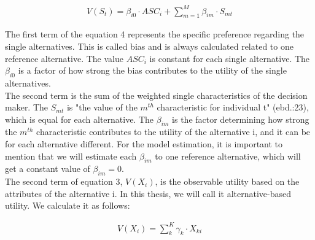\documentclass[12pt,dvipsnames]{article}%
\begin{document}
\begin{center}
\begin{align}
V(S_t) = \beta_{i0} \cdot ASC_i  +  \sum_{m=1}^M \beta_{im} \cdot S_{mt} \label{eq:test4}
\end{align}
\end{center}

The first term of the equation 4 represents the specific preference regarding the single alternatives. This is called bias and is always calculated related to one reference alternative. The value $ASC_i$ is constant for each single alternative. The $\beta_{i0}$ is a factor of how strong the bias contributes to the utility of the single alternatives. \\
The second term is the sum of the weighted single characteristics of the decision maker. The $S_{mt}$ is "the value of the $m^{th}$ characteristic for individual t" (ebd.:23), which is equal for each alternative.  The $\beta_{im}$ is the factor determining how strong the $m^{th}$ characteristic contributes to the utility of the alternative i, and it can be for each alternative different. For the model estimation, it is important to mention that we will estimate each $\beta_{im}$ to one reference alternative, which will get a constant value of $\beta_{im} = 0$. \\
%
The second term of equation 3, $V(X_i)$, is the observable utility based on the attributes of the alternative i. In this thesis, we will call it alternative-based utility. We calculate it as follows:

\vspace{-1.2cm}
 
 \begin{center}
\begin{align}
V(X_i) =  \sum_k^K \gamma_{k} \cdot X_{ki} \label{eq:test5}
\end{align}
\end{center}
\end{document}
